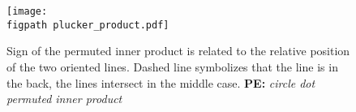 \documentclass{elsarticle}
\newcommand{\figpath}{figures/}
\newcommand{\notePE}[1]{{\color{Orange} \textbf{PE: } \textit{#1}}}
\newcommand{\plucker}{Pl\"{u}cker }
\begin{document}
\begin{figure}[!htb]
  \begin{center}        
    \texttt{[image: \\figpath plucker\_product.pdf]}
  \end{center}
  \caption{Sign of the permuted inner product is related to the relative position of the two oriented lines. Dashed line symbolizes that the line is in the back, the lines intersect in the middle case.
           \notePE{circle dot permuted inner product}}
  \label{fig:plucker_products}
\end{figure}


\end{document}
